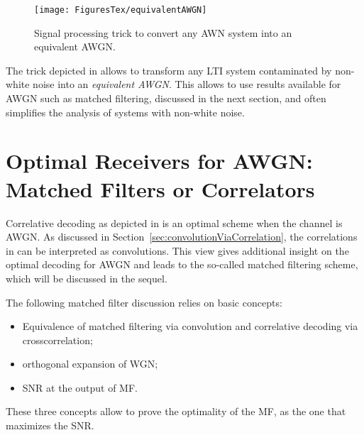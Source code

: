 \begin{figure}[htbp]
\centering
\texttt{[image: FiguresTex/equivalentAWGN]}
\caption{Signal processing trick to convert any AWN system into an equivalent AWGN.\label{fig:equivalentAWGN}}
\end{figure}

The trick depicted in  allows to transform any LTI system
contaminated by non-white noise into an \emph{equivalent AWGN}.
 This allows to use results available for AWGN such as matched filtering, discussed
in the next section, and 
 often simplifies the analysis of systems with non-white noise.

\section{Optimal Receivers for AWGN: Matched Filters or Correlators}
\label{sec:optimalReceiversAWGN}



Correlative decoding as depicted in  is an optimal scheme when
the channel is AWGN. As discussed in Section~\ref{sec:convolutionViaCorrelation}, the correlations
in  can be interpreted as convolutions. This view gives additional
insight on the optimal decoding for AWGN and leads to the so-called matched filtering scheme, which
will be discussed in the sequel.

The following matched filter discussion relies on basic concepts:
\begin{itemize}
	\item Equivalence of matched filtering via convolution and correlative decoding via crosscorrelation;
	\item orthogonal expansion of WGN;
	\item SNR at the output of MF.
\end{itemize}
These three concepts allow to prove the optimality of the MF, as the one that maximizes
the SNR.

